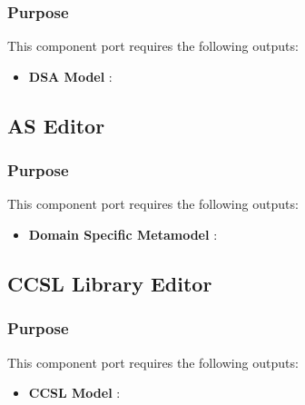 \documentclass{gemoc} %
\begin{document}

\subsubsection{Purpose}


This component port requires the following outputs:
\begin{itemize}
  \item \textbf{DSA Model} :
\end{itemize}

\subsection{AS Editor}


\subsubsection{Purpose}


This component port requires the following outputs:
\begin{itemize}
  \item \textbf{Domain Specific Metamodel} :
\end{itemize}

\subsection{CCSL Library Editor}


\subsubsection{Purpose}


This component port requires the following outputs:
\begin{itemize}
  \item \textbf{CCSL Model} :
\end{itemize}
\end{document}

